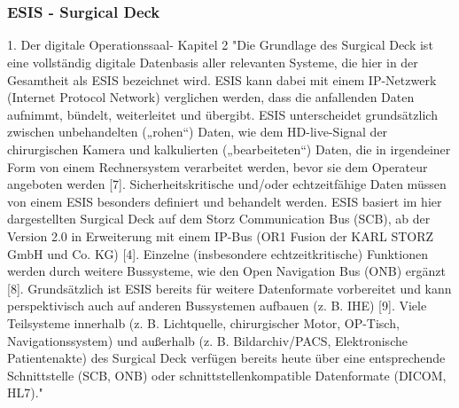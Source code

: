 \chapter{}
\label{sec:overview}

\subsection{ESIS - Surgical Deck}
1. Der digitale Operationssaal- Kapitel 2
	"Die Grundlage des Surgical Deck ist eine vollständig digitale Datenbasis aller relevanten
	Systeme, die hier in der Gesamtheit als ESIS bezeichnet wird. ESIS kann dabei mit
	einem IP-Netzwerk (Internet Protocol Network) verglichen werden, dass die anfallenden
	Daten aufnimmt, bündelt, weiterleitet und übergibt. ESIS unterscheidet grundsätzlich
	zwischen unbehandelten („rohen“) Daten, wie dem HD-live-Signal der chirurgischen
	Kamera und kalkulierten („bearbeiteten“) Daten, die in irgendeiner Form
	von einem Rechnersystem verarbeitet werden, bevor sie dem Operateur angeboten
	werden [7]. Sicherheitskritische und/oder echtzeitfähige Daten müssen von einem
	ESIS besonders definiert und behandelt werden. ESIS basiert im hier dargestellten
	Surgical Deck auf dem Storz Communication Bus (SCB), ab der Version 2.0 in Erweiterung
	mit einem IP-Bus (OR1 Fusion der KARL STORZ GmbH und Co. KG) [4]. Einzelne
	(insbesondere echtzeitkritische) Funktionen werden durch weitere Bussysteme, wie
	den Open Navigation Bus (ONB) ergänzt [8]. Grundsätzlich ist ESIS bereits für weitere
	Datenformate vorbereitet und kann perspektivisch auch auf anderen Bussystemen
	aufbauen (z. B. IHE) [9]. Viele Teilsysteme innerhalb (z. B. Lichtquelle, chirurgischer
	Motor, OP-Tisch, Navigationssystem) und außerhalb (z. B. Bildarchiv/PACS, Elektronische
	Patientenakte) des Surgical Deck verfügen bereits heute über eine entsprechende
	Schnittstelle (SCB, ONB) oder schnittstellenkompatible Datenformate (DICOM, HL7)."